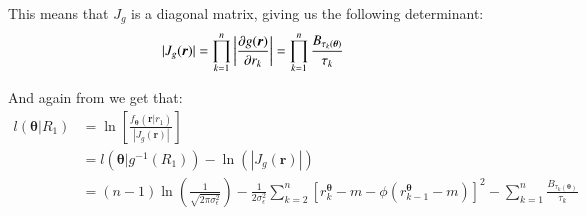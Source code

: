 This means that $J_{g}$ is a diagonal matrix, giving us the following determinant: 
\begin{align*}
|J_{g}(\bm{r})| 
&= 
\prod_{k=1}^{n}
\bigg{|}
\frac{\partial g(\bm{r})}{\partial r_{k}}
\bigg{|}
= 
\prod_{k=1}^{n}\frac{B_{\tau_{k}(\bm{\theta})}}{\tau_{k}}
\end{align*}

And again from \cite{remillard2013statistical} we get that:
\begin{align*}
l(\bm{\theta}|R_{1}) &= 
\ln\left[
\frac{
 f_{\bm{\theta}}(\bm{r}|r_{1})
 }{
 |J_{g}(\bm{r})|
 }  
\right] \\
&= 
l(\bm{\theta}|g^{-1}(R_{1})) - \ln(|J_{g}(\bm{r})|) \\ 
&= 
(n-1)\ln\left(
\frac{1}{
\sqrt{2\pi \sigma_{\epsilon}^{2}}
}
\right)
- \frac{1}{2\sigma_{\epsilon}^{2}}
\sum_{k=2}^{n}\left[
r_{k}^{\bm{\theta}} - m - \phi(r_{k-1}^{\bm{\theta}} -m)
\right]^{2}
- \sum_{k=1}^{n}\frac{B_{\tau_{k}(\bm{\theta})}}{\tau_{k}}
\end{align*}









